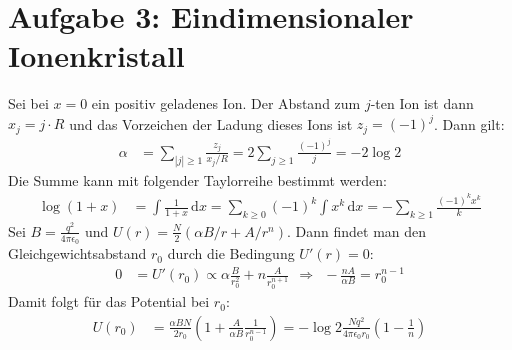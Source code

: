 \documentclass[a4paper,12pt]{article}
\newcommand{\kla}{}
\begin{document}
\section*{Aufgabe 3: Eindimensionaler Ionenkristall}
Sei bei $x=0$ ein positiv geladenes Ion. Der Abstand zum $j$-ten Ion ist dann $x_j=j\cdot R$ und das Vorzeichen der Ladung dieses Ions ist $z_j=(-1)^j$. Dann gilt:
\begin{align*}
\alpha&=\sum_{|j|\ge 1}\frac{z_j}{x_j/R}=2\sum_{j\ge 1}\frac{(-1)^j}{j}=-2\log 2
\end{align*}
Die Summe kann mit folgender Taylorreihe bestimmt werden:
\begin{align*}
\log(1+x)&=\int\frac{1}{1+x}\,\mathrm{d}x=\sum_{k\ge 0}(-1)^k\int x^k\,\mathrm{d}x=-\sum_{k\ge 1}\frac{(-1)^kx^k}{k}
\end{align*}
Sei $B=\frac{q^2}{4\pi\epsilon_0}$ und $U(r)=\frac{N}{2}(\alpha B/r+A/r^n)$. Dann findet man den Gleichgewichtsabstand $r_0$ durch die Bedingung $U'(r)=0$:
\begin{align*}
0&=U'(r_0)\propto\alpha\frac{B}{r_0^2}+n\frac{A}{r_0^{n+1}}\ \ \Rightarrow\ \ -\frac{nA}{\alpha B}=r_0^{n-1}
\end{align*}
Damit folgt für das Potential bei $r_0$:
\begin{align*}
U(r_0)&=\frac{\alpha BN}{2r_0}\kla\left( {1+\frac{A}{\alpha B}\frac{1}{r_0^{n-1}}} \right)=-\log 2\frac{Nq^2}{4\pi\epsilon_0r_0}\kla\left( {1-\frac{1}{n}} \right)
\end{align*}
\end{document}
